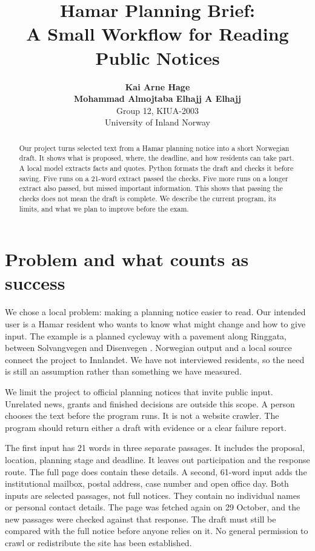 \documentclass{article}
\title{Hamar Planning Brief:\\A Small Workflow for Reading Public Notices}
\author{\textbf{Kai Arne Hage}\\\textbf{Mohammad Almojtaba Elhajj A Elhajj}\\
Group 12, KIUA-2003\\University of Inland Norway}
\begin{document}
\raggedbottom
\maketitle
\begin{abstract}
Our project turns selected text from a Hamar planning notice into a short Norwegian
draft. It shows what is proposed, where, the deadline, and how residents can take
part. A local model extracts facts and quotes. Python formats the draft and checks
it before saving. Five runs on a 21-word extract passed the checks. Five more runs
on a longer extract also passed, but missed important information. This shows that
passing the checks does not mean the draft is complete. We describe the current
program, its limits, and what we plan to improve before the exam.
\end{abstract}

\section{Problem and what counts as success}
We chose a local problem: making a planning notice easier to read. Our intended
user is a Hamar resident who wants to know what might change and how to give input.
The example is a planned cycleway with a pavement along Ringgata, between
Solvangvegen and Disenvegen \citep{hamar}. Norwegian output and a local source
connect the project to Innlandet. We have not interviewed residents, so the need
is still an assumption rather than something we have measured.

We limit the project to official planning notices that invite public input.
Unrelated news, grants and finished decisions are outside this scope. A person
chooses the text before the program runs. It is not a website crawler. The program
should return either a draft with evidence or a clear failure report.

The first input has 21 words in three separate passages. It includes the proposal,
location, planning stage and deadline. It leaves out participation and the response
route. The full page does contain these details. A second, 61-word input adds the
institutional mailbox, postal address, case number and open office day. Both inputs
are selected passages, not full notices. They contain no individual names or
personal contact details. The page was fetched again on 29 October, and the new
passages were checked against that response. The draft must still be compared
with the full notice before anyone relies on it.
No general permission to crawl or redistribute the site has been established.
\end{document}

